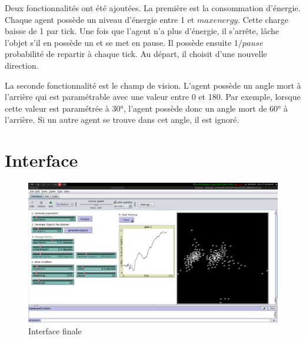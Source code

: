 \documentclass{article}
\begin{document}
Deux fonctionnalités ont été ajoutées. La première est la consommation d'énergie. Chaque agent possède un niveau d'énergie entre 1 et $maxenergy$. Cette charge baisse de 1 par tick. Une fois que l'agent n'a plus d'énergie, il s'arrête, lâche l'objet s'il en possède un et se met en pause. Il possède ensuite $1/pause$ probabilité de repartir à chaque tick. Au départ, il choisit d'une nouvelle direction.

La seconde fonctionnalité est le champ de vision. L'agent possède un angle mort à l'arrière qui est paramétrable avec une valeur entre 0 et 180. Par exemple, lorsque cette valeur est paramétrée à 30°, l'agent possède donc un angle mort de 60° à l'arrière. Si un autre agent se trouve dans cet angle, il est ignoré.

\section{Interface}
\begin{figure}[h]
	\begin{center}
		\includegraphics[scale=0.3]{img/interface}
		\caption{Interface finale}
		\label{fig:interface}
	\end{center}
\end{figure}
\end{document}
